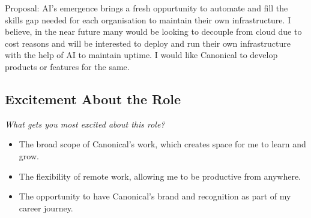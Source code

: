 \documentclass{article}
\begin{document}
Proposal:
AI's emergence brings a fresh oppurtunity to automate and fill the skills gap needed for each organisation to maintain their own infrastructure.
I believe, in the near future many would be looking to decouple from cloud due to cost reasons and will be interested to deploy 
and run their own infrastructure with the help of AI to maintain uptime. I would like Canonical to develop products or features for 
the same.

\subsection{Excitement About the Role}
\small \textit{What gets you most excited about this role?} 
\normalsize 
\begin{itemize}
    \item The broad scope of Canonical's work, which creates space for me to learn and grow.  
    \item The flexibility of remote work, allowing me to be productive from anywhere.  
    \item The opportunity to have Canonical's brand and recognition as part of my career journey.  
\end{itemize}
\end{document}
